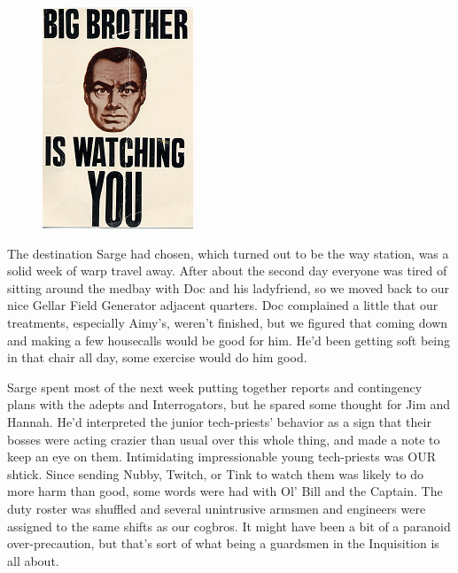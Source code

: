 \begin{figure}
	\begin{center}
		\includegraphics[width=\figwidth]{pics/11/39.png}
	\end{center}
\end{figure}
The destination Sarge had chosen, which turned out to be the way station, was a solid week of warp travel away. 
After about the second day everyone was tired of sitting around the medbay with Doc and his ladyfriend, so we moved back to our nice Gellar Field Generator adjacent quarters. 
Doc complained a little that our treatments, especially Aimy's, weren't finished, but we figured that coming down and making a few housecalls would be good for him. 
He'd been getting soft being in that chair all day, some exercise would do him good.

Sarge spent most of the next week putting together reports and contingency plans with the adepts and Interrogators, but he spared some thought for Jim and Hannah. 
He'd interpreted the junior tech-priests' behavior as a sign that their bosses were acting crazier than usual over this whole thing, and made a note to keep an eye on them. 
Intimidating impressionable young tech-priests was OUR shtick. 
Since sending Nubby, Twitch, or Tink to watch them was likely to do more harm than good, some words were had with Ol' Bill and the Captain. 
The duty roster was shuffled and several unintrusive armsmen and engineers were assigned to the same shifts as our cogbros. 
It might have been a bit of a paranoid over-precaution, but that's sort of what being a guardsmen in the Inquisition is all about.

